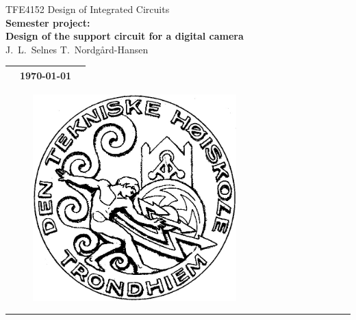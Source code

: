 \documentclass[a4paper, 12pt, english]{article}
\begin{document}
\begin{minipage}[c]{0.85\textwidth}
  \huge \centering
  TFE4152 Design of Integrated Circuits\\
  \vspace{1ex}
  \huge \textbf{
    Semester project:\\
    Design of the support circuit for a digital camera
  }\\
  \vspace{1ex}
  \Large
  J.~L.~Selnes T.~Nordgård-Hansen
  \vspace{3ex}
  
  \normalsize
  
  \begin{tabular}{p{} p{} p{}}
    \toprule
    & \today\\
    \bottomrule
  \end{tabular}
\end{minipage}

\begin{figure}[H]
  \centering
  \includegraphics[width=0.7\textwidth]{figures/logo}
\end{figure}


\newpage
\setlength{\parskip}{0ex}
\renewcommand{\baselinestretch}{0.1}\normalsize
\onehalfspacing
\tableofcontents
\singlespacing
\renewcommand{\baselinestretch}{1.00}\normalsize
\setlength{\parskip}{2ex}
\rule{\textwidth}{1pt}
\end{document}
